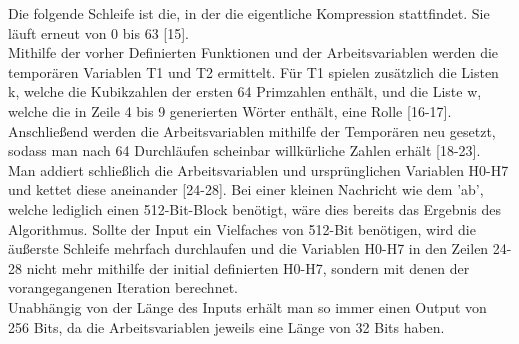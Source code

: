 Die folgende Schleife ist die, in der die eigentliche Kompression stattfindet. Sie läuft erneut von 0 bis 63 [15].\\
Mithilfe der vorher Definierten Funktionen und der Arbeitsvariablen werden die temporären Variablen T1 und T2 ermittelt. 
Für T1 spielen zusätzlich die Listen k, welche die Kubikzahlen der ersten 64 Primzahlen enthält, und die Liste w, welche die in Zeile 4 bis 9 generierten Wörter enthält, eine Rolle [16-17].\\
Anschließend werden die Arbeitsvariablen mithilfe der Temporären neu gesetzt, sodass man nach 64 Durchläufen scheinbar willkürliche Zahlen erhält [18-23].\\
Man addiert schließlich die Arbeitsvariablen und ursprünglichen Variablen H0-H7 und kettet diese aneinander [24-28]. Bei einer kleinen Nachricht wie dem 'ab', welche lediglich einen 512-Bit-Block benötigt, wäre dies bereits das Ergebnis des Algorithmus. Sollte der Input ein Vielfaches von 512-Bit benötigen, wird die äußerste Schleife mehrfach durchlaufen und die Variablen H0-H7 in den Zeilen 24-28 nicht mehr mithilfe der initial definierten H0-H7, sondern mit denen der vorangegangenen Iteration berechnet.\\
Unabhängig von der Länge des Inputs erhält man so immer einen Output von 256 Bits, da die Arbeitsvariablen jeweils eine Länge von 32 Bits haben.


